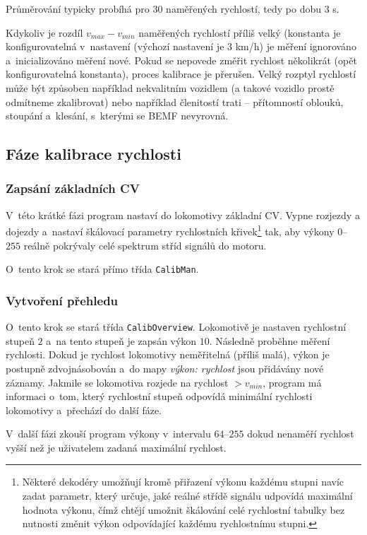 Průměrování typicky probíhá pro $30$ naměřených rychlostí, tedy po dobu 3 s.

Kdykoliv je rozdíl $v_{max} - v_{min}$ naměřených rychlostí příliš velký
(konstanta je konfigurovatelná v~nastavení (výchozí nastavení je 3 km/h) je
měření ignorováno a~inicializováno měření nové. Pokud se nepovede změřit
rychlost několikrát (opět konfigurovatelná konstanta), proces kalibrace je
přerušen. Velký rozptyl rychlostí může být způsoben například nekvalitním
vozidlem (a takové vozidlo prostě odmítneme zkalibrovat) nebo například
členitostí trati -- přítomností oblouků, stoupání a~klesání, s~kterými se BEMF
nevyrovná.

\subsection{Fáze kalibrace rychlosti}

\subsubsection{Zapsání základních CV}

V~této krátké fázi program nastaví do lokomotivy základní CV. Vypne rozjezdy a
dojezdy a~nastaví škálovací parametry rychlostních křivek\footnote{Některé
dekodéry umožňují kromě přiřazení výkonu každému stupni navíc zadat parametr,
který určuje, jaké reálné střídě signálu udpovídá maximální hodnota výkonu,
čímž chtějí umožnit škálování celé rychlostní tabulky bez nutnosti změnit výkon
odpovídající každému rychlostnímu stupni.} tak, aby výkony $0$--$255$ reálně
pokrývaly celé spektrum stříd signálů do motoru.

O~tento krok se stará přímo třída \texttt{CalibMan}.

\subsubsection{Vytvoření přehledu}

O~tento krok se stará třída \texttt{CalibOverview}.
Lokomotivě je nastaven rychlostní stupeň $2$ a~na tento stupeň je zapsán výkon
$10$. Následně proběhne měření rychlosti. Dokud je rychlost lokomotivy
neměřitelná (příliš malá), výkon je postupně zdvojnásobován a~do mapy
\textit{výkon: rychlost} jsou přidávány nové záznamy. Jakmile se lokomotiva
rozjede na rychlost $> v_{min}$, program má informaci o~tom, který rychlostní
stupeň odpovídá minimální rychlosti lokomotivy a~přechází do další fáze.

V~další fázi zkouší program výkony v~intervalu $64$--$255$ dokud nenaměří
rychlost vyšší než je uživatelem zadaná maximální rychlost.

